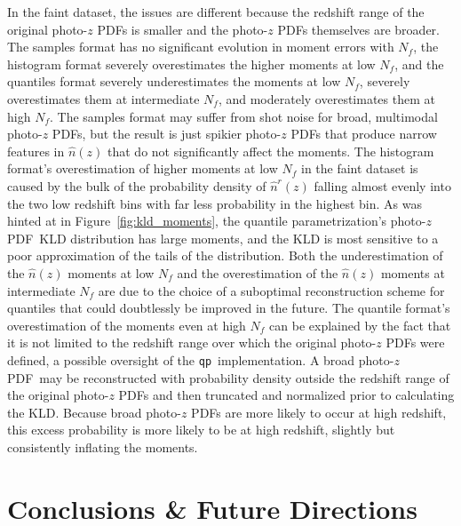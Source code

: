 \documentclass[\docopts]{\docclass}
\newcommand{\qp}{\texttt{qp}}
\newcommand{\pz}{photo-$z$ PDF}
\newcommand{\ssdata}{faint\xspace}
\begin{document}
In the \ssdata dataset, the issues are different because the redshift range of 
the original \pz s is smaller and the \pz s themselves are broader.
The samples format has no significant evolution in moment errors with $N_{f}$, 
the histogram format severely overestimates the higher moments at low $N_{f}$, 
and the quantiles format severely underestimates the moments at low $N_{f}$, 
severely overestimates them at intermediate $N_{f}$, and moderately 
overestimates them at high $N_{f}$.
The samples format may suffer from shot noise for broad, multimodal \pz s, but 
the result is just spikier \pz s that produce narrow features in $\hat{n}(z)$ 
that do not significantly affect the moments.
The histogram format's overestimation of higher moments at low $N_{f}$ in the 
\ssdata dataset is caused by the bulk of the probability density of 
$\hat{n}^{r}(z)$ falling almost evenly into the two low redshift bins with far 
less probability in the highest bin.
As was hinted at in Figure~\ref{fig:kld_moments}, the quantile 
parametrization's \pz\ KLD distribution has large moments, and the KLD is most 
sensitive to a poor approximation of the tails of the distribution.
Both the underestimation of the $\hat{n}(z)$ moments at low $N_{f}$ and the 
overestimation of the $\hat{n}(z)$ moments at intermediate $N_{f}$ are due to 
the choice of a suboptimal reconstruction scheme for quantiles that could 
doubtlessly be improved in the future.
The quantile format's overestimation of the moments even at high $N_{f}$ can be 
explained by the fact that it is not limited to the redshift range over which 
the original \pz s were defined, a possible oversight of the \qp\ 
implementation.
A broad \pz\ may be reconstructed with probability density outside the redshift 
range of the original \pz s and then truncated and normalized prior to 
calculating the KLD.
Because broad \pz s are more likely to occur at high redshift, this excess 
probability is more likely to be at high redshift, slightly but consistently 
inflating the moments.


\section{Conclusions \& Future Directions}
\label{sec:conclusions}
\end{document}
